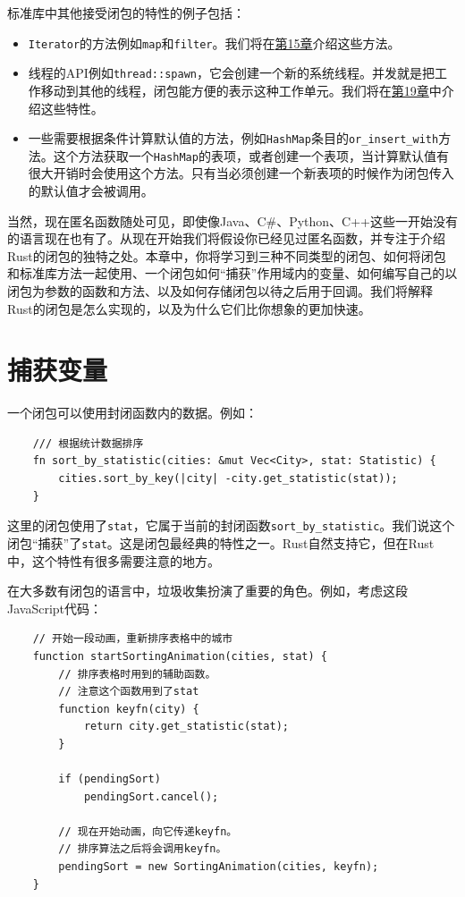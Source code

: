 标准库中其他接受闭包的特性的例子包括：
\begin{itemize}
    \item \texttt{Iterator}的方法例如\texttt{map}和\texttt{filter}。我们将在\hyperref[ch15]{第15章}介绍这些方法。
    \item 线程的API例如\texttt{thread::spawn}，它会创建一个新的系统线程。并发就是把工作移动到其他的线程，闭包能方便的表示这种工作单元。我们将在\hyperref[ch19]{第19章}中介绍这些特性。
    \item 一些需要根据条件计算默认值的方法，例如\texttt{HashMap}条目的\texttt{or\_insert\_with}方法。这个方法获取一个\texttt{HashMap}的表项，或者创建一个表项，当计算默认值有很大开销时会使用这个方法。只有当必须创建一个新表项的时候作为闭包传入的默认值才会被调用。
\end{itemize}

当然，现在匿名函数随处可见，即使像Java、C\#、Python、C++这些一开始没有的语言现在也有了。从现在开始我们将假设你已经见过匿名函数，并专注于介绍Rust的闭包的独特之处。本章中，你将学习到三种不同类型的闭包、如何将闭包和标准库方法一起使用、一个闭包如何“捕获”作用域内的变量、如何编写自己的以闭包为参数的函数和方法、以及如何存储闭包以待之后用于回调。我们将解释Rust的闭包是怎么实现的，以及为什么它们比你想象的更加快速。

\section{捕获变量}
一个闭包可以使用封闭函数内的数据。例如：
\begin{verbatim}
    /// 根据统计数据排序
    fn sort_by_statistic(cities: &mut Vec<City>, stat: Statistic) {
        cities.sort_by_key(|city| -city.get_statistic(stat));
    }
\end{verbatim}

这里的闭包使用了\texttt{stat}，它属于当前的封闭函数\texttt{sort\_by\_statistic}。我们说这个闭包“捕获”了\texttt{stat}。这是闭包最经典的特性之一。Rust自然支持它，但在Rust中，这个特性有很多需要注意的地方。

在大多数有闭包的语言中，垃圾收集扮演了重要的角色。例如，考虑这段JavaScript代码：
\begin{verbatim}
    // 开始一段动画，重新排序表格中的城市
    function startSortingAnimation(cities, stat) {
        // 排序表格时用到的辅助函数。
        // 注意这个函数用到了stat
        function keyfn(city) {
            return city.get_statistic(stat);
        }

        if (pendingSort)
            pendingSort.cancel();

        // 现在开始动画，向它传递keyfn。
        // 排序算法之后将会调用keyfn。
        pendingSort = new SortingAnimation(cities, keyfn);
    }
\end{verbatim}

